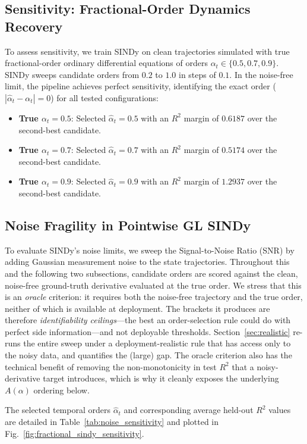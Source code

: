 \documentclass[review,3p,times]{elsarticle}
\begin{document}
\subsection{Sensitivity: Fractional-Order Dynamics Recovery}
To assess sensitivity, we train SINDy on clean trajectories simulated with true fractional-order ordinary differential equations of orders $\alpha_t \in \{0.5, 0.7, 0.9\}$. SINDy sweeps candidate orders from $0.2$ to $1.0$ in steps of $0.1$.
In the noise-free limit, the pipeline achieves perfect sensitivity, identifying the exact order ($|\hat{\alpha}_t - \alpha_t| = 0$) for all tested configurations:
\begin{itemize}
  \item \textbf{True $\alpha_t = 0.5$}: Selected $\hat{\alpha}_t = 0.5$ with an $R^2$ margin of $0.6187$ over the second-best candidate.
  \item \textbf{True $\alpha_t = 0.7$}: Selected $\hat{\alpha}_t = 0.7$ with an $R^2$ margin of $0.5174$ over the second-best candidate.
  \item \textbf{True $\alpha_t = 0.9$}: Selected $\hat{\alpha}_t = 0.9$ with an $R^2$ margin of $1.2937$ over the second-best candidate.
\end{itemize}

\subsection{Noise Fragility in Pointwise GL SINDy}
To evaluate SINDy's noise limits, we sweep the Signal-to-Noise Ratio (SNR) by adding Gaussian measurement noise to the state trajectories. Throughout this and the following two subsections, candidate orders are scored against the clean, noise-free ground-truth derivative evaluated at the true order. We stress that this is an \emph{oracle} criterion: it requires both the noise-free trajectory and the true order, neither of which is available at deployment. The brackets it produces are therefore \emph{identifiability ceilings}---the best an order-selection rule could do with perfect side information---and not deployable thresholds. Section~\ref{sec:realistic} re-runs the entire sweep under a deployment-realistic rule that has access only to the noisy data, and quantifies the (large) gap. The oracle criterion also has the technical benefit of removing the non-monotonicity in test $R^2$ that a noisy-derivative target introduces, which is why it cleanly exposes the underlying $A(\alpha)$ ordering below.

The selected temporal orders $\hat{\alpha}_t$ and corresponding average held-out $R^2$ values are detailed in Table~\ref{tab:noise_sensitivity} and plotted in Fig.~\ref{fig:fractional_sindy_sensitivity}.
\end{document}
